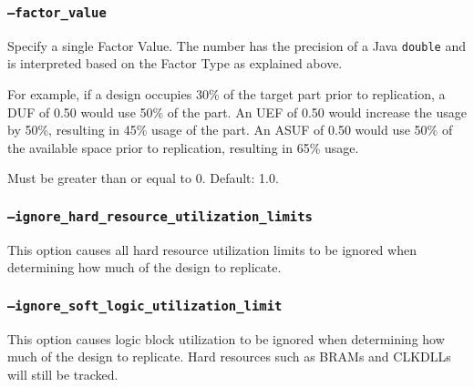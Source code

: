 \subsubsection{\texttt{--factor\_value}}
Specify a single Factor Value.  The number has the precision of a Java 
\texttt{double} and is interpreted based on the Factor Type as explained above.

For example, if a design occupies 30\% of the target part prior to replication,
a DUF of 0.50 would use 50\% of the part. An UEF of 0.50 would increase the
usage by 50\%, resulting in 45\% usage of the part. An ASUF of 0.50 would use
50\% of the available space prior to replication, resulting in 65\% usage.

Must be greater than or equal to 0. Default: 1.0.

\subsubsection{\texttt{--ignore\_hard\_resource\_utilization\_limits}}
This option causes all hard resource utilization limits to be ignored when
determining how much of the design to replicate.

\subsubsection{\texttt{--ignore\_soft\_logic\_utilization\_limit}}
This option causes logic block utilization to be ignored when
determining how much of the design to replicate. Hard resources such as BRAMs
and CLKDLLs will still be tracked.





